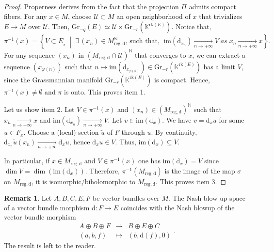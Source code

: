 \documentclass[10pt]{article}
\theoremstyle{plain}
\theoremstyle{definition}
\newtheorem{remark}[lemma]{Remark}
\theoremstyle{remark}
\newcommand{\dd}{\mathrm{d}}
\begin{document}
\begin{proof} Properness derives from the fact that the projection $\Pi$ admits compact fibers. For any $x\in M$, choose $\mathcal U\subset M$ an open neighborhood of $x$ that trivializes $E\longrightarrow M$ over $\mathcal{U}$. Then, $\mathrm{Gr}_{-q}(E)\simeq \mathcal{U}\times\mathrm{Gr}_{-r}(\mathbb{K}^{\mathrm{rk}(E)})$. Notice that,     \begin{equation*}
        \pi^{-1}(x)=\left\{V\subset E_{_x}\;\middle|\; \exists\, (x_n)\in M_{\mathrm{reg},\dd}^{\mathbb{N}},\, \text{such that},\,\;\mathrm{im}(\dd_{x_n})\underset{n \to +\infty}{\longrightarrow} V\; as \; x_n\underset{n \to +\infty}{\longrightarrow}x\right\}.
    \end{equation*}For any sequence $(x_n)$ in $\left(M_{\mathrm{reg},\dd}\cap\mathcal{U}\right)^\mathbb{N}$ that converges to $x$, we can extract a sequence $(x_{\varphi(n)})$ such that $n\mapsto \mathrm{im}(\dd_{x_{\varphi(n)}})\in \mathrm{Gr}_{-r}(\mathbb{K}^{\mathrm{rk}(E)})$ has a limit $V$, since the Grassmannian manifold $\mathrm{Gr}_{-r}(\mathbb{K}^{\mathrm{rk}(E)})$ is compact. Hence, $\pi^{-1}(x)\neq  	\emptyset$ and $\pi$ is onto. This proves item 1.

Let us show item 2. {Let $V\in \pi^{-1}(x)$ and $(x_n)\in (M_{\mathrm{reg},\dd})^{\mathbb{N}}$ such that $x_n\underset{n \to +\infty}{\longrightarrow}x$\;  and  \; $\mathrm{im}(\dd_{x_n})\underset{n \to +\infty}{\longrightarrow} V$. Let $v\in\mathrm{im}(\dd_{x})$. We have $v=\dd_{x}u$ for some $u\in {F_x}$. Choose a (local) section $\widetilde{u}$ of $F$ through $u$. By continuity,  $\dd_{x_n}\widetilde{u}(x_n)\underset{n \to +\infty}{\longrightarrow}\dd_{x}u$, hence $\dd_{x}u\in V$. Thus, $\mathrm{im}(\dd_{x})\subseteq V$.}

In particular, if $x\in M_{\mathrm{reg}, \dd}$ and $V\in \pi^{-1}(x)$ one has $\mathrm{im}(\dd_{x})= V$ since $\dim V= \dim(\mathrm{im}(\dd_{x}))$. Therefore, $\pi^{-1}(M_{\mathrm{reg},\dd})$  is the image of the map $\sigma$ on $M_{\mathrm{reg},\dd}$, it is isomorphic/biholomorphic to $M_{\mathrm{reg},\dd}$. This proves item 3.
\end{proof}

\begin{remark}
\label{rmk:invariance}
Let $A,B,C,E,F$ be vector bundles over  $M$.
The Nash blow up space of a vector bundle morphism $ \dd : F \to E$ coincides with
the Nash blowup of the vector bundle morphism 
 $$ \begin{array}{rcl}  A \oplus B \oplus F  &\to & B \oplus E \oplus C\\  (a,b,f)  & \mapsto & (b,\dd (f),0) \end{array} .$$
The result is left to the reader.
\end{remark}
\end{document}
